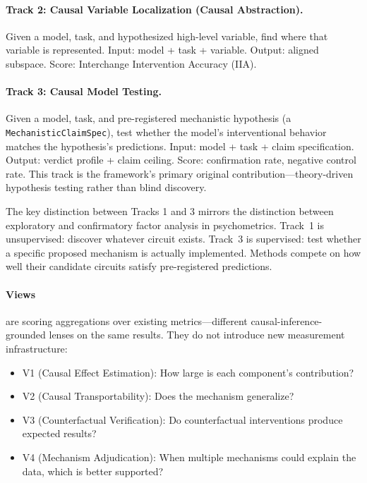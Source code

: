 \documentclass[10pt]{article}
\begin{document}
\paragraph{Track 2: Causal Variable Localization (Causal Abstraction).} Given a model, task, and hypothesized high-level variable, find where that variable is represented. Input: model + task + variable. Output: aligned subspace. Score: Interchange Intervention Accuracy (IIA).

\paragraph{Track 3: Causal Model Testing.} Given a model, task, and pre-registered mechanistic hypothesis (a \texttt{MechanisticClaimSpec}), test whether the model's interventional behavior matches the hypothesis's predictions. Input: model + task + claim specification. Output: verdict profile + claim ceiling. Score: confirmation rate, negative control rate. This track is the framework's primary original contribution---theory-driven hypothesis testing rather than blind discovery.

The key distinction between Tracks 1 and 3 mirrors the distinction between exploratory and confirmatory factor analysis in psychometrics. Track~1 is unsupervised: discover whatever circuit exists. Track~3 is supervised: test whether a specific proposed mechanism is actually implemented. Methods compete on how well their candidate circuits satisfy pre-registered predictions.

\paragraph{Views} are scoring aggregations over existing metrics---different causal-inference-grounded lenses on the same results. They do not introduce new measurement infrastructure:
\begin{itemize}[nosep]
    \item V1 (Causal Effect Estimation): How large is each component's contribution?
    \item V2 (Causal Transportability): Does the mechanism generalize?
    \item V3 (Counterfactual Verification): Do counterfactual interventions produce expected results?
    \item V4 (Mechanism Adjudication): When multiple mechanisms could explain the data, which is better supported?
\end{itemize}
\end{document}
